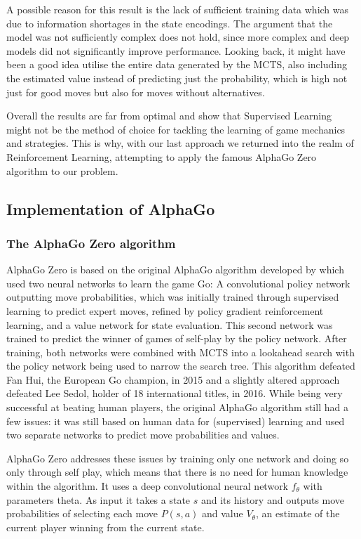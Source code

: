 \documentclass[12pt,a4paper]{article}
\begin{document}
{A possible reason for this result is the lack of sufficient training data which was due to information shortages in the state encodings. The argument that the model was not sufficiently complex does not hold, since more complex and deep models did not significantly improve performance. Looking back, it might have been a good idea utilise the entire data generated by the MCTS, also including the estimated value instead of predicting just the probability, which is high not just for good moves but also for moves without alternatives.

Overall the results are far from optimal and show that Supervised Learning might not be the method of choice for tackling the learning of game mechanics and strategies. This is why, with our last approach we returned into the realm of Reinforcement Learning, attempting to apply the famous AlphaGo Zero algorithm to our problem.

\subsection{Implementation of AlphaGo}
\subsubsection{The AlphaGo Zero algorithm}
AlphaGo Zero is based on the original AlphaGo algorithm developed by \citet{silver_mastering_2017} which used two neural networks to learn the game Go: A convolutional policy network outputting move probabilities, which was initially trained through supervised learning to predict expert moves, refined by policy gradient reinforcement learning, and a value network for state evaluation. This second network was trained to predict the winner of games of self-play by the policy network. After training, both networks were combined with MCTS into a lookahead search with the policy network being used to narrow the search tree. This algorithm defeated Fan Hui, the European Go champion, in 2015 and a slightly altered approach defeated Lee Sedol, holder of 18 international titles, in 2016. While being very successful at beating human players, the original AlphaGo algorithm still had a few issues: it was still based on human data for (supervised) learning and used two separate networks to predict move probabilities and values. 

AlphaGo Zero addresses these issues by training only one network and doing so only through self play, which means that there is no need for human knowledge within the algorithm. It uses a deep convolutional neural network $f_\theta$ with parameters theta. As input it takes a state $s$ and its history and outputs move probabilities of selecting each move $P(s,a)$ and value $V_\theta$, an estimate of the current player winning from the current state. 

}
\end{document}
